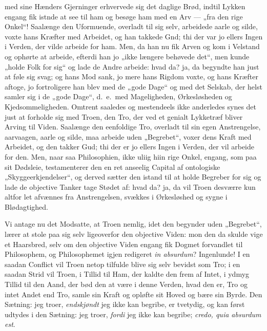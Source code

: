 med sine Hænders Gjerninger erhvervede sig det daglige Brød, indtil
Lykken engang fik
 istnde at see til ham og besøge ham med en Arv --- „fra den rige
Onkel“! Saalænge den Uformuende, overladt til sig selv, arbeidede
aarle og silde, voxte hans Kræfter med Arbeidet, og han takkede
Gnd; thi der var jo ellers Ingen i Verden, der vilde arbeide for
ham. Men, da han nu fik Arven og kom i Velstand og ophørte at
arbeide, efterdi han jo „ikke længere behøvede det“, men kunde
„holde Folk for sig“ og lade de Andre arbeide: hvad da? ja, da
begyndte han just at føle sig svag; og hans Mod sank, jo mere hans
Rigdom voxte, og hans Kræfter aftoge, jo fortroligere han blev med
de „gode Dage“ og med det Selskab, der helst samler sig i de „gode
Dage“, d.\ e.\ med Mageligheden, Ørkesløsheden og
Kjedsommeligheden. Omtrent saaledes og mestendeels ikke anderledes
synes det just at forholde sig med Troen, den Tro, der ved et
genialt Lykketræf bliver Arving til Viden. Saalænge den eenfoldige
Tro, overladt til sin egen Anstrengelse, aarvaagen, aarle og
silde, maa arbeide uden „Begrebet“, voxer dens Kraft med Arbeidet,
og den takker Gud; thi der er jo ellers Ingen i Verden, der vil
arbeide for den. Men, naar saa Philosophien, ikke uliig hiin rige
Onkel, engang, som paa sit Dødsleie, testamenterer den en ret
anseelig Capital af ontologiske „Skyggeerkjendelser“, og derved
sætter den istand til at holde Begreber for sig og lade de
objective Tanker tage Stødet af: hvad da? ja, da vil Troen desværre
kun altfor let afvænnes fra Anstrengelsen, svækkes i Ørkesløshed
og sygne i Blødagtighed.

 Vi antage nu det Modsatte, at Troen nemlig, idet den begynder uden
„Begrebet“, lærer at stole paa sig selv ligeoverfor den objective
Viden: mon den da skulde vige et Haarsbred, selv om den objective
Viden engang fik Dogmet forvandlet til Philosophem, og
Philosophemet igjen redigeret \textit{in absurdum}? Ingenlunde! I
en saadan Conflict vil Troen netop tilfulde blive sig selv bevidst
som Tro; i en saadan Strid vil Troen, i Tillid til Ham, der kaldte
den frem af Intet, i ydmyg Tillid til den Aand, der bød den at
være i denne Verden, hvad den er, Tro og intet Andet end Tro,
samle sin Kraft og opløfte sit Hoved og bære sin Byrde. Den
Sætning: jeg troer, \emph{endskjøndt} jeg ikke kan begribe, er
tvetydig, og kan først udtydes i den Sætning: jeg troer,
\emph{fordi} jeg ikke kan begribe; \textit{credo, quia absurdum
est}.

